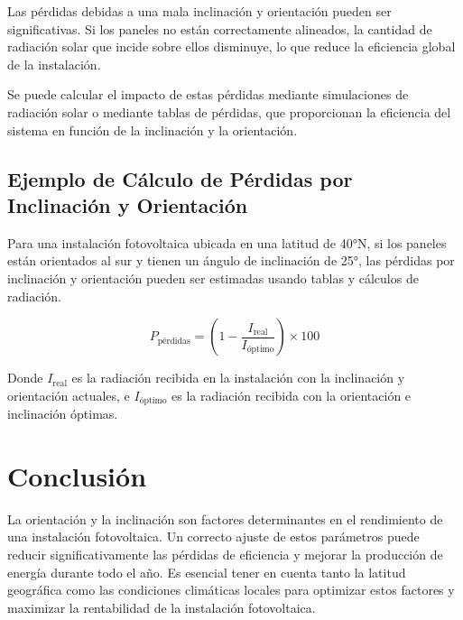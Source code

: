 \documentclass[a4paper,12pt]{article}
\begin{document}
Las pérdidas debidas a una mala inclinación y orientación pueden ser significativas. Si los paneles no están correctamente alineados, la cantidad de radiación solar que incide sobre ellos disminuye, lo que reduce la eficiencia global de la instalación.

Se puede calcular el impacto de estas pérdidas mediante simulaciones de radiación solar o mediante tablas de pérdidas, que proporcionan la eficiencia del sistema en función de la inclinación y la orientación.

\subsection{Ejemplo de Cálculo de Pérdidas por Inclinación y Orientación}

Para una instalación fotovoltaica ubicada en una latitud de 40°N, si los paneles están orientados al sur y tienen un ángulo de inclinación de 25°, las pérdidas por inclinación y orientación pueden ser estimadas usando tablas y cálculos de radiación.

\begin{equation}
    P_{\text{pérdidas}} = \left(1 - \frac{I_{\text{real}}}{I_{\text{óptimo}}}\right) \times 100
\end{equation}

Donde \( I_{\text{real}} \) es la radiación recibida en la instalación con la inclinación y orientación actuales, e \( I_{\text{óptimo}} \) es la radiación recibida con la orientación e inclinación óptimas.

\section{Conclusión}

La orientación y la inclinación son factores determinantes en el rendimiento de una instalación fotovoltaica. Un correcto ajuste de estos parámetros puede reducir significativamente las pérdidas de eficiencia y mejorar la producción de energía durante todo el año. Es esencial tener en cuenta tanto la latitud geográfica como las condiciones climáticas locales para optimizar estos factores y maximizar la rentabilidad de la instalación fotovoltaica.
\end{document}
